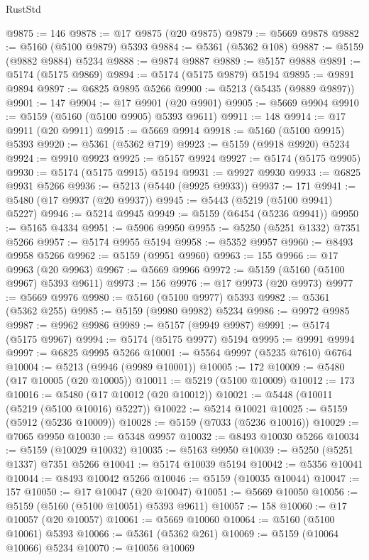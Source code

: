 \begin{lexlean}{RustStd}
\begin{coremodule}
@9875 := 146
@9878 := @17 @9875 (@20 @9875)
@9879 := @5669 @9878
@9882 := @5160 (@5100 @9879) @5393
@9884 := @5361 (@5362 @108)
@9887 := @5159 (@9882 @9884) @5234
@9888 := @9874 @9887
@9889 := @5157 @9888
@9891 := @5174 (@5175 @9869)
@9894 := @5174 (@5175 @9879) @5194
@9895 := @9891 @9894
@9897 := @6825 @9895 @5266
@9900 := @5213 (@5435 (@9889 @9897))
@9901 := 147
@9904 := @17 @9901 (@20 @9901)
@9905 := @5669 @9904
@9910 := @5159 (@5160 (@5100 @9905) @5393 @9611)
@9911 := 148
@9914 := @17 @9911 (@20 @9911)
@9915 := @5669 @9914
@9918 := @5160 (@5100 @9915) @5393
@9920 := @5361 (@5362 @719)
@9923 := @5159 (@9918 @9920) @5234
@9924 := @9910 @9923
@9925 := @5157 @9924
@9927 := @5174 (@5175 @9905)
@9930 := @5174 (@5175 @9915) @5194
@9931 := @9927 @9930
@9933 := @6825 @9931 @5266
@9936 := @5213 (@5440 (@9925 @9933))
@9937 := 171
@9941 := @5480 (@17 @9937 (@20 @9937))
@9945 := @5443 (@5219 (@5100 @9941) @5227)
@9946 := @5214 @9945
@9949 := @5159 (@6454 (@5236 @9941))
@9950 := @5165 @4334
@9951 := @5906 @9950
@9955 := @5250 (@5251 @1332) @7351 @5266
@9957 := @5174 @9955 @5194
@9958 := @5352 @9957
@9960 := @8493 @9958 @5266
@9962 := @5159 (@9951 @9960)
@9963 := 155
@9966 := @17 @9963 (@20 @9963)
@9967 := @5669 @9966
@9972 := @5159 (@5160 (@5100 @9967) @5393 @9611)
@9973 := 156
@9976 := @17 @9973 (@20 @9973)
@9977 := @5669 @9976
@9980 := @5160 (@5100 @9977) @5393
@9982 := @5361 (@5362 @255)
@9985 := @5159 (@9980 @9982) @5234
@9986 := @9972 @9985
@9987 := @9962 @9986
@9989 := @5157 (@9949 @9987)
@9991 := @5174 (@5175 @9967)
@9994 := @5174 (@5175 @9977) @5194
@9995 := @9991 @9994
@9997 := @6825 @9995 @5266
@10001 := @5564 @9997 (@5235 @7610) @6764
@10004 := @5213 (@9946 (@9989 @10001))
@10005 := 172
@10009 := @5480 (@17 @10005 (@20 @10005))
@10011 := @5219 (@5100 @10009)
@10012 := 173
@10016 := @5480 (@17 @10012 (@20 @10012))
@10021 := @5448 (@10011 (@5219 (@5100 @10016) @5227))
@10022 := @5214 @10021
@10025 := @5159 (@5912 (@5236 @10009))
@10028 := @5159 (@7033 (@5236 @10016))
@10029 := @7065 @9950
@10030 := @5348 @9957
@10032 := @8493 @10030 @5266
@10034 := @5159 (@10029 @10032)
@10035 := @5163 @9950
@10039 := @5250 (@5251 @1337) @7351 @5266
@10041 := @5174 @10039 @5194
@10042 := @5356 @10041
@10044 := @8493 @10042 @5266
@10046 := @5159 (@10035 @10044)
@10047 := 157
@10050 := @17 @10047 (@20 @10047)
@10051 := @5669 @10050
@10056 := @5159 (@5160 (@5100 @10051) @5393 @9611)
@10057 := 158
@10060 := @17 @10057 (@20 @10057)
@10061 := @5669 @10060
@10064 := @5160 (@5100 @10061) @5393
@10066 := @5361 (@5362 @261)
@10069 := @5159 (@10064 @10066) @5234
@10070 := @10056 @10069

\end{coremodule}
\end{lexlean}
